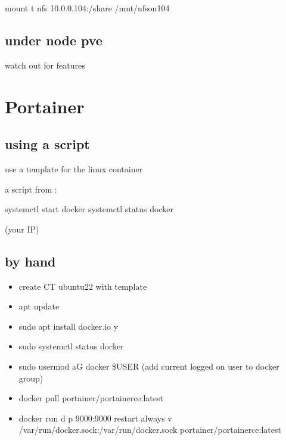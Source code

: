 \documentclass[letterpaper,10pt,english]{sphinxmanual}
\begin{document}
\sphinxAtStartPar
mount \sphinxhyphen{}t nfs 10.0.0.104:/share /mnt/nfson104


\section{under node pve}
\label{\detokenize{nfs_client:under-node-pve}}
\sphinxAtStartPar
watch out for features

\sphinxstepscope


\chapter{Portainer}
\label{\detokenize{portainer:portainer}}\label{\detokenize{portainer::doc}}

\section{using a script}
\label{\detokenize{portainer:using-a-script}}
\sphinxAtStartPar
use a template for the linux container

\sphinxAtStartPar
a script from :

\sphinxAtStartPar
systemctl start docker
systemctl status docker

\sphinxAtStartPar
{} (your IP)


\section{by hand}
\label{\detokenize{portainer:by-hand}}\begin{itemize}
\item {} 
\sphinxAtStartPar
create CT ubuntu22 with template

\item {} 
\sphinxAtStartPar
apt update

\item {} 
\sphinxAtStartPar
sudo apt install docker.io \sphinxhyphen{}y

\item {} 
\sphinxAtStartPar
sudo systemctl status docker

\item {} 
\sphinxAtStartPar
sudo usermod \sphinxhyphen{}aG docker \$USER (add current logged on user to docker group)

\item {} 
\sphinxAtStartPar
docker pull portainer/portainer\sphinxhyphen{}ce:latest

\item {} 
\sphinxAtStartPar
docker run \sphinxhyphen{}d \sphinxhyphen{}p 9000:9000 \textendash{}restart always \sphinxhyphen{}v /var/run/docker.sock:/var/run/docker.sock portainer/portainer\sphinxhyphen{}ce:latest

\end{itemize}
\end{document}
